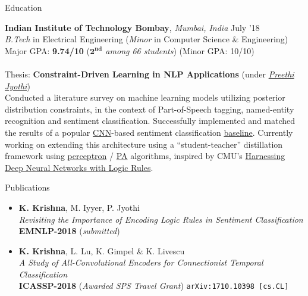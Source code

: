 \documentclass{resume} %
\begin{document}
\vspace*{-1mm}
\begin{rSection}{Education}

{\bf Indian Institute of Technology Bombay}, \textit{Mumbai, India} \hfill {July '18} \\ 
\textit{B.Tech} in Electrical Engineering (\textit{Minor} in Computer Science \& Engineering)\\
Major GPA: \textbf{9.74/10} (\textit{$\mathbf{2^{nd}}$ among 66 students}) (Minor GPA: 10/10)\\\\
Thesis: \textbf{Constraint-Driven Learning in NLP Applications} (under \textit{\href{https://www.cse.iitb.ac.in/~pjyothi/}{Preethi Jyothi}}) \\
Conducted a literature survey on machine learning models utilizing posterior distribution constraints, in the context of Part-of-Speech tagging, named-entity recognition and sentiment classification. Successfully implemented and matched the results of a popular \href{https://en.wikipedia.org/wiki/Convolutional_neural_network}{CNN}-based sentiment classification \href{https://arxiv.org/abs/1408.5882}{baseline}. Currently working on extending this architecture using a ``student-teacher'' distillation framework using \href{http://www.cs.columbia.edu/~mcollins/papers/tagperc.pdf}{perceptron} / \href{http://jmlr.csail.mit.edu/papers/volume7/crammer06a/crammer06a.pdf}{PA} algorithms, inspired by CMU's \href{https://arxiv.org/pdf/1603.06318.pdf}{Harnessing Deep Neural Networks with Logic Rules}.
\end{rSection}
\vspace*{-1.5mm}
\begin{rSection}{Publications}
\begin{itemize}[leftmargin=*]
\item \textbf{K. Krishna}, M. Iyyer, P. Jyothi\\\textit{Revisiting the Importance of Encoding Logic Rules in Sentiment Classification}\\ \textbf{EMNLP-2018} (\textit{submitted})
\item \textbf{K. Krishna}, L. Lu, K. Gimpel \&  K. Livescu\\\textit{A Study of All-Convolutional Encoders for Connectionist Temporal Classification}\\ \textbf{ICASSP-2018} (\textit{Awarded SPS Travel Grant}) \texttt{arXiv:1710.10398 [cs.CL]} 
\end{itemize}
\end{rSection}
\end{document}
